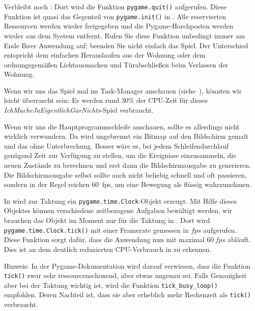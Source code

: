 Verbleibt noch : Dort wird die Funktion \texttt{pygame.quit()} aufgerufen. Diese Funktion ist quasi das Gegenteil von \texttt{pygame.init()} in . Alle reservierten Ressourcen werden wieder freigegeben und die Pygame-Horchposten werden wieder aus dem System entfernt. Rufen Sie diese Funktion unbedingt immer am Ende Ihrer Anwendung auf; beenden Sie nicht einfach das Spiel. Der Unterschied entspricht dem einfachen Herauslaufen aus der Wohnung oder dem ordnungsgemäßen Lichtausmachen und Türabschließen beim Verlassen der Wohnung.  

Wenn wir uns das Spiel mal im Task-Manager anschauen (siehe~), könnten wir leicht überrascht sein: Es werden rund 30\% der CPU-Zeit für dieses \emph{IchMacheJaEigentlichGarNichts}-Spiel verbraucht. 


Wenn wir uns die Hauptprogrammschleife anschauen, sollte es allerdings nicht wirklich verwundern. Da wird ungebremst ein Bitmap auf den Bildschirm gemalt und das ohne Unterbrechung. Besser wäre es, bei jedem Schleifendurchlauf genügend Zeit zur Verfügung zu stellen, um die Ereignisse einzusammeln, die neuen Zustände zu berechnen und erst dann die Bildschirmausgabe zu generieren. Die Bildschirmausgabe selbst sollte auch nicht beliebig schnell und oft passieren, sondern in der Regel reichen 60~\gls{fps}, um eine Bewegung als flüssig wahrzunehmen. 


In  wird zur Taktung ein \texttt{pygame.time.Clock}-Objekt erzeugt. Mit Hilfe dieses Objektes können verschiedene zeitbezogene Aufgaben bewältigt werden, wir brauchen das Objekt im Moment nur für die Taktung in . Dort wird \texttt{pygame.time.Clock.\-tick()} mit einer Framerate gemessen in $fps$ aufgerufen. Diese Funktion sorgt dafür, dass die Anwendung nun mit maximal $60~fps$ abläuft. Dies ist an dem deutlich reduzierten CPU-Verbrauch in  zu erkennen.

Hinweis: In der Pygame-Dokumentation wird darauf verwiesen, dass die Funktion \texttt{tick()} zwar sehr ressourcenschonend, aber etwas ungenau sei. Falls Genauigkeit aber bei der Taktung wichtig ist, wird die Funktion \texttt{tick\_busy\_loop()} empfohlen. Deren Nachteil ist, dass sie aber erheblich mehr Rechenzeit als \texttt{tick()} verbraucht.

